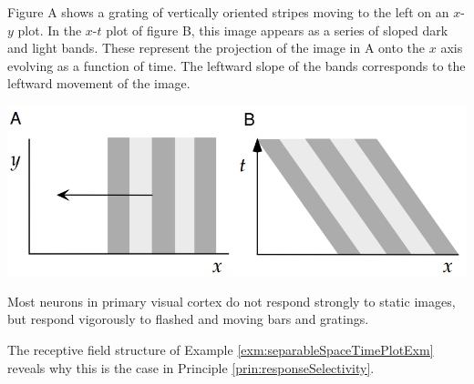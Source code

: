 \begin{exm}
  Figure A shows a grating of vertically oriented stripes moving to the left on an $x$-$y$ plot. In the $x$-$t$ plot of figure B, this image appears as a series of sloped dark and light bands. These represent the
projection of the image in A onto the $x$ axis evolving as a function of time. The leftward slope of the bands corresponds to the leftward
movement of the image.
  \begin{center}
    \includegraphics[scale=0.3]{./png/spaceTimeDiagramExm1}
  \end{center}
\end{exm}

\begin{prin}
  \label{prin:responseSelectivity}
  Most neurons in primary visual cortex do not respond strongly to static images, but respond vigorously to flashed and moving bars and gratings.
\end{prin}

\begin{rem}
  The receptive field structure of Example \ref{exm:separableSpaceTimePlotExm} reveals why this is the case in Principle \ref{prin:responseSelectivity}.
\end{rem}

